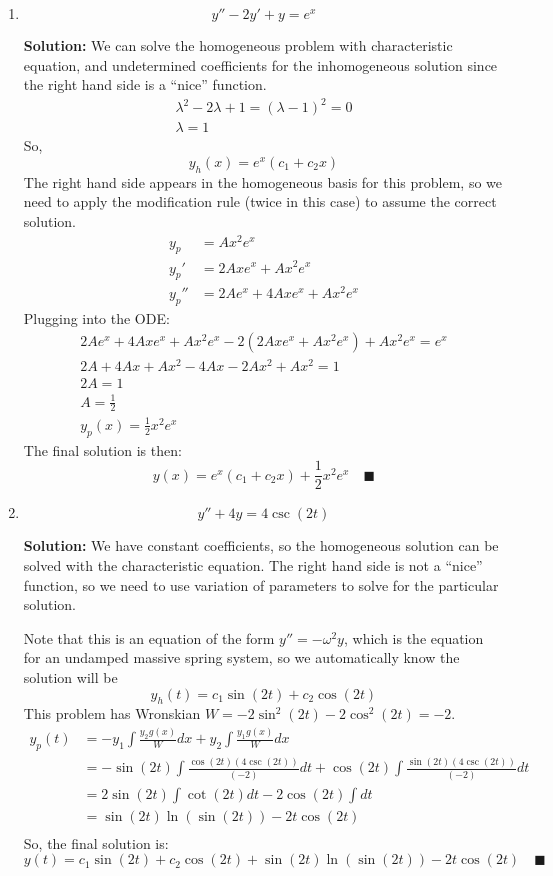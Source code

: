 \documentclass[letterpaper, fontsize=10pt]{scrartcl} %
\numberwithin{equation}{section} %
\numberwithin{figure}{section} %
\numberwithin{table}{section} %
\begin{document}
\begin{enumerate}
\begin{enumerate}[label=(\alph*)]
\item 
\[ y'' - 2y' + y = e^x \]
\par \textbf{Solution:} We can solve the homogeneous problem with characteristic equation, and undetermined coefficients for the inhomogeneous solution since the right hand side is a ``nice'' function. 
\begin{gather*}
\lambda^2 - 2\lambda + 1 = (\lambda -1)^2 = 0\\
\lambda = 1
\end{gather*}
So,
\[ y_h(x) = e^x(c_1 + c_2x)\]
The right hand side appears in the homogeneous basis for this problem, so we need to apply the modification rule (twice in this case) to assume the correct solution. 
\begin{align*}
y_p &= Ax^2 e^x\\
y_p' &= 2Axe^x + Ax^2e^x\\
y_p'' &= 2Ae^x + 4Axe^x + Ax^2e^x
\end{align*}
Plugging into the ODE:
\begin{gather*}
2Ae^x + 4Axe^x + Ax^2e^x - 2(2Axe^x + Ax^2e^x)+ Ax^2 e^x = e^x \\
2A + 4Ax + Ax^2 - 4Ax -2 Ax^2 + Ax^2 = 1 \\
2A = 1 \\
A = \frac{1}{2}\\
y_p(x) = \frac{1}{2}x^2e^x
\end{gather*}
The final solution is then:
\[ y(x) = e^x(c_1 + c_2x) + \frac{1}{2}x^2e^x \quad\blacksquare\]

\item 
\[ y'' + 4y = 4 \csc(2t) \]
\par \textbf{Solution:} We have constant coefficients, so the homogeneous solution can be solved with the characteristic equation. The right hand side is not a ``nice'' function, so we need to use variation of parameters to solve for the particular solution. 
\par Note that this is an equation of the form $y'' = - \omega^2 y$, which is the equation for an undamped massive spring system, so we automatically know the solution will be
\[ y_h(t) = c_1 \sin(2t) + c_2 \cos(2t) \]
This problem has Wronskian $W = -2\sin^2(2t) - 2\cos^2(2t) = -2$.
\begin{align*}
y_p(t) &= -y_1 \int \frac{y_2 g(x)}{W}dx + y_2 \int \frac{y_1 g(x)}{W}dx\\
&= -\sin(2t) \int \frac{\cos(2t) (4\csc(2t))}{(-2)}dt + \cos(2t) \int \frac{\sin(2t) (4\csc(2t))}{(-2)}dt\\
&= 2 \sin(2t) \int \cot(2t) dt - 2\cos(2t) \int dt\\
&= \sin(2t)\ln(\sin(2t)) - 2t\cos(2t)\\
\end{align*}
So, the final solution is:
\[y(t) = c_1 \sin(2t) + c_2 \cos(2t) + \sin(2t)\ln(\sin(2t)) - 2t\cos(2t) \quad\blacksquare\]


\end{enumerate}
\end{enumerate}
\end{document}
